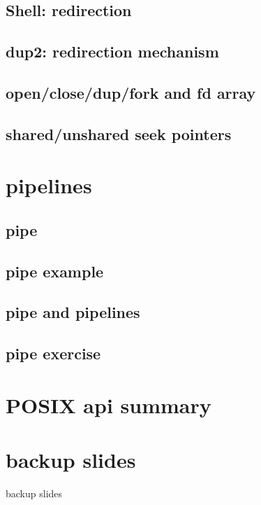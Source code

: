 \subsection{Shell: redirection}






\subsection{dup2: redirection mechanism}



\subsection{open/close/dup/fork and fd array}


\subsection{shared/unshared seek pointers}


\section{pipelines}

\subsection{pipe}



\subsection{pipe example}


\subsection{pipe and pipelines}


\subsection{pipe exercise}

\section{POSIX api summary}





\section{backup slides}
\begin{frame}{backup slides}
\end{frame}







